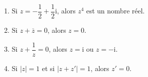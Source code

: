 \begin{exercice}
\begin{enumerate}
\item Si $z = - \dfrac{1}{2} + \dfrac{1}{2}\text{i}$, alors $z^4$ est un nombre r\'eel.
\item Si $z + \overline{z} = 0$, alors $z = 0$.
\item Si $z + \dfrac{1}{z} = 0$, alors $z = \text{i}$ ou $z = - \text{i}$.
\item Si $|z| = 1$ et si $|z + z'| = 1$, alors $z' = 0$.
\end{enumerate}

 
\end{exercice}
